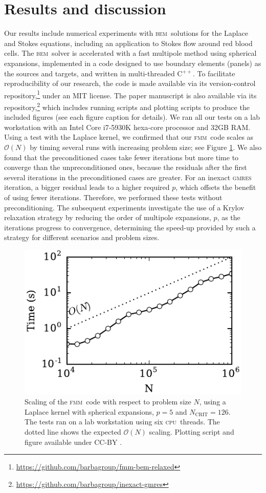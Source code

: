 \documentclass[final,3p,times]{elsarticle}
\newcommand{\cpu}{\textsc{cpu}}
\newcommand{\bem}{\textsc{bem}\xspace}
\newcommand{\fmm}{\textsc{fmm}\xspace}
\newcommand{\cpp}{C$^{++}$}
\renewcommand{\O}[1]{\mathcal{O}(#1)}
\newcommand{\ncrit}{N_{\text{CRIT}}}
\newcommand{\gmres}{\textsc{gmres}\xspace}
\begin{document}
\section{Results and discussion}
Our results include numerical experiments with \bem\ solutions for the Laplace and Stokes equations, including an application to Stokes flow around red blood cells. The \bem\ solver is accelerated with a fast multipole method using spherical expansions, implemented in a code designed to use boundary elements (panels) as the sources and targets, and written in multi-threaded \cpp. To facilitate reproducibility of our research, the code is made available via its version-control repository,\footnote{\href{https://github.com/barbagroup/fmm-bem-relaxed}{https://github.com/barbagroup/fmm-bem-relaxed}} under an MIT license. The paper manuscript is also available via its repository,\footnote{\href{https://github.com/barbagroup/inexact-gmres}{https://github.com/barbagroup/inexact-gmres}} which includes running scripts and plotting scripts to produce the included figures (see each figure caption for details).
We ran all our tests on a lab workstation with an Intel Core i7-5930K hexa-core processor and 32GB RAM. Using a test with the Laplace kernel, we confirmed that our \fmm\ code scales as $\O{N}$ by timing several runs with increasing problem size; see Figure \ref{fig:fmm_scaling}. We also found that the preconditioned cases take fewer iterations but more time to converge than the unpreconditioned ones, because the residuals after the first several iterations in the preconditioned cases are greater. For an inexact {\gmres} iteration, a bigger residual leads to a higher required $p$, which offsets the benefit of using fewer iterations. Therefore, we performed these tests without preconditioning.
The subsequent experiments investigate the use of a Krylov relaxation strategy by reducing the order of multipole expansions, $p$, as the iterations progress to convergence, determining the speed-up provided by such a strategy for different scenarios and problem sizes.

\begin{figure}[h]
\begin{center}
	\includegraphics[width=0.5 \textwidth]{FMMScaling.pdf}
	\caption{Scaling of the \fmm\ code with respect to problem size $N$, using a Laplace kernel with spherical expansions, $p=5$ and  $\ncrit = 126$. The tests ran on a lab workstation using six \cpu\ threads. The dotted line shows the expected $\O{N}$ scaling. Plotting script and figure available under CC-BY \cite{WangLaytonBarba2016-figshare1}.}
	\label{fig:fmm_scaling}
\end{center}
\end{figure}
\end{document}

